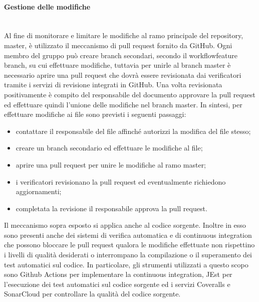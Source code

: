 	\paragraph{Gestione delle modifiche}\mbox{}\\ [1mm]
		Al fine di monitorare e limitare le modifiche al ramo principale del repository\glo, master, è utilizzato il meccanismo di pull request fornito da GitHub. Ogni membro del gruppo può creare branch secondari, secondo il workflow\glosp feature branch, su cui effettuare modifiche, tuttavia per unirle al branch master è necessario aprire una pull request che dovrà essere revisionata dai verificatori tramite i servizi di revisione integrati in GitHub. Una volta revisionata positivamente è compito del responsabile del documento approvare la pull request ed effettuare quindi l'unione delle modifiche nel branch master.
		\newline
		In sintesi, per effettuare modifiche ai file sono previsti i seguenti passaggi:
		\begin{itemize}
			\item contattare il responsabile del file affinché autorizzi la modifica del file stesso;
			\item creare un branch secondario ed effettuare le modifiche al file;
			\item aprire una pull request per unire le modifiche al ramo master;
			\item i verificatori revisionano la pull request ed eventualmente richiedono aggiornamenti;
			\item completata la revisione il responsabile approva la pull request.
		\end{itemize}
	
		Il meccanismo sopra esposto si applica anche al codice sorgente. Inoltre in esso sono presenti anche dei sistemi di verifica automatica e di continuous integration che possono bloccare le pull request qualora le modifiche effettuate non rispettino i livelli di qualità desiderati o interrompano la compilazione o il superamento dei test automatici sul codice. In particolare, gli strumenti utilizzati a questo scopo sono Github Actions per implementare la continuous integration, JEst per l'esecuzione dei test automatici sul codice sorgente ed i servizi Coveralls e SonarCloud per controllare la qualità del codice sorgente.
		

